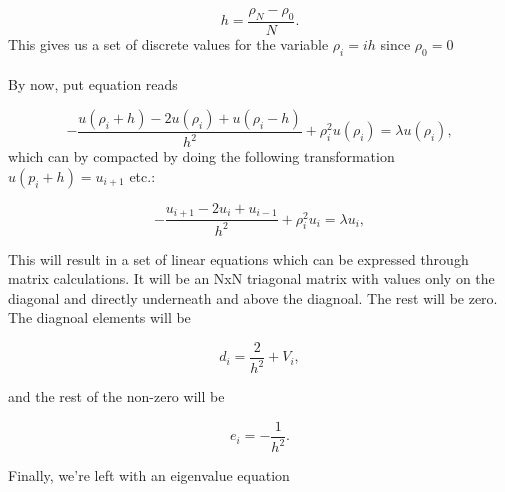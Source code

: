 \documentclass[10pt]{article}
\begin{document}
\begin{multicols}{2}
\begin{equation*}
  h=\frac{\rho_N-\rho_0 }{N}.
\end{equation*}
This gives us a set of discrete values for the variable $\rho_i = ih$ since
$\rho_0 = 0$\\\\ By now, put equation reads

\begin{equation}
-\frac{u(\rho_i+h) -2u(\rho_i) +u(\rho_i-h)}{h^2}+\rho_i^2u(\rho_i)  = \lambda u(\rho_i),
\end{equation}
which can by compacted by doing the following transformation
$u(p_i+h)=u_{i+1}$ etc.:

\begin{equation}
-\frac{u_{i+1} -2u_i +u_{i-1} }{h^2}+\rho_i^2u_i  = \lambda u_i,
\end{equation}

This will result in a set of linear equations which can be expressed
through matrix calculations. It will be an NxN triagonal matrix with values
only on the diagonal and directly underneath and above the diagnoal. The
rest will be zero. The diagnoal elements will be

\begin{equation*}
   d_i=\frac{2}{h^2}+V_i,
\end{equation*}

and the rest of the non-zero will be

\begin{equation*}
   e_i=-\frac{1}{h^2}.
\end{equation*}

Finally, we're left with an eigenvalue equation



\end{multicols}
\end{document}
